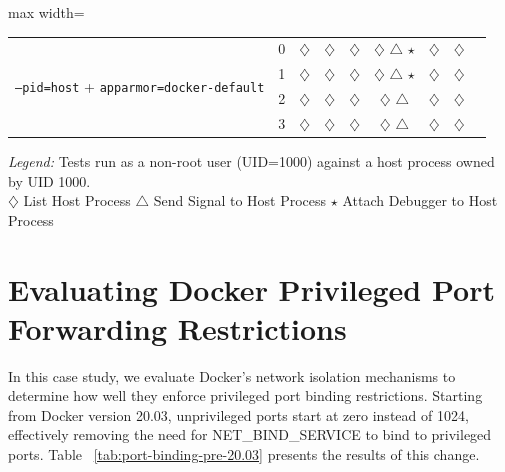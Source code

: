 \begin{doublespace}
\begin{table}[!h]
\begin{adjustbox}{max width=\textwidth}
\begin{tabular}{|l|c|c|c|c|c|c|c|c|}
        \multirow{4}{*}{\texttt{--pid=host} + \texttt{apparmor=docker-default}} 
            & 0 & $\diamondsuit$ & $\diamondsuit$ & $\diamondsuit$ & $\diamondsuit$ $\triangle$ $\star$ & $\diamondsuit$ & $\diamondsuit$ \\
            & 1 & $\diamondsuit$ & $\diamondsuit$ & $\diamondsuit$ & $\diamondsuit$ $\triangle$ $\star$ & $\diamondsuit$ & $\diamondsuit$ \\
            & 2 & $\diamondsuit$ & $\diamondsuit$ & $\diamondsuit$ & $\diamondsuit$ $\triangle$ & $\diamondsuit$ & $\diamondsuit$ \\
            & 3 & $\diamondsuit$ & $\diamondsuit$ & $\diamondsuit$ & $\diamondsuit$ $\triangle$ & $\diamondsuit$ & $\diamondsuit$ \\
        \hline
    \end{tabular}
    \end{adjustbox}
    \textit{Legend:}{
        Tests run as a non-root user (UID=1000) against a host process owned by UID 1000.\\
        $\diamondsuit$ List Host Process \quad 
        $\triangle$ Send Signal to Host Process \quad 
        $\star$ Attach Debugger to Host Process
    }
\end{table}
























\section{Evaluating Docker Privileged Port Forwarding Restrictions}
\label{sec:evaluating-docker-privileged-port-forwarding-restrictions}

In this case study, we evaluate Docker's network isolation mechanisms to determine how well they enforce privileged port binding restrictions. Starting from Docker version 20.03, unprivileged ports start at zero instead of 1024, effectively removing the need for NET\_BIND\_SERVICE to bind to privileged ports. Table ~\ref{tab:port-binding-pre-20.03} presents the results of this change.


\end{doublespace}
